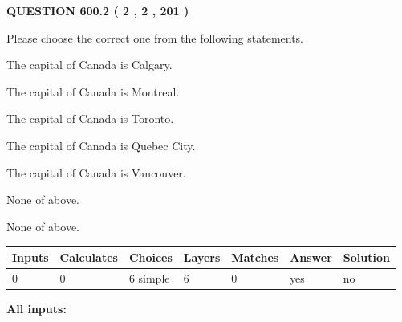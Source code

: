 \documentclass[12pt]{article}
\begin{document}
   
  
\vspace{0.2in}
  
{\textbf{\Large{QUESTION
600.2 
 ( 2 , 2 , 201 )
}}}
  
  
Please choose the correct one from the following statements.
 
 
The capital of Canada is Calgary.
 
 
The capital of Canada is Montreal.
 
 
The capital of Canada is Toronto.
 
 
The capital of Canada is Quebec City.
 
 
The capital of Canada is Vancouver.
 
 
 None of above.
 
 
\noindent{}
 
 
 None of above.
 
 
\noindent{}
 
 
   
   
   
   
\noindent\begin{tabular}{|l|l|l|l|l|l|l|}
 \hline
Inputs & Calculates & Choices & Layers & Matches & Answer & Solution \\ \hline
 0  & 
 0  & 
 6
  simple  
  & 
 6  & 
 0  & 
  yes & 
  no 
  \\ \hline
 \end{tabular}
   
   
   
   
\noindent{}
   
   
   
   
\noindent\vspace{0.1in}\hspace{-0.08in} {\textbf{\Large{All inputs: }}}
   
   
   
   
   
   
 \vspace{0.2in}
 
   
   
\end{document}

